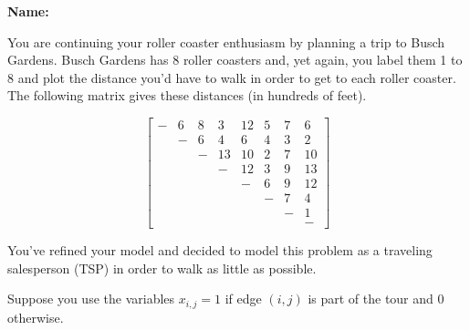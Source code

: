 \documentclass[letterpaper,oneside,12pt]{article}%
\begin{document}
\noindent{}

\vspace{3mm} \hspace{\fill} \textbf{Name: \underline{\hspace{6cm}}}

You are continuing your roller coaster enthusiasm by planning a trip to Busch Gardens. Busch Gardens has 8 roller coasters and, yet again, you label them 1 to 8 and plot the distance you'd have to walk in order to get to each roller coaster. The following matrix gives these distances (in hundreds of feet).

\[
\begin{bmatrix}
-& 6  & 8  & 3  & 12 & 5  & 7 & 6  \\
 & -  & 6  & 4  & 6  & 4  & 3 & 2  \\
 &    & -  & 13 & 10 & 2  & 7 & 10 \\
 &    &    & -  & 12 & 3  & 9 & 13 \\
 &    &    &    & -  & 6  & 9 & 12 \\
 &    &    &    &    & -  & 7 & 4  \\
 &    &    &    &    &    & - & 1  \\
 &    &    &    &    &    &   & -
\end{bmatrix}
\]

You've refined your model and decided to model this problem as a traveling salesperson (TSP) in order to walk as little as possible.

Suppose you use the variables $x_{i,j} = 1$ if edge $(i,j)$ is part of the tour and 0 otherwise.
\end{document}
